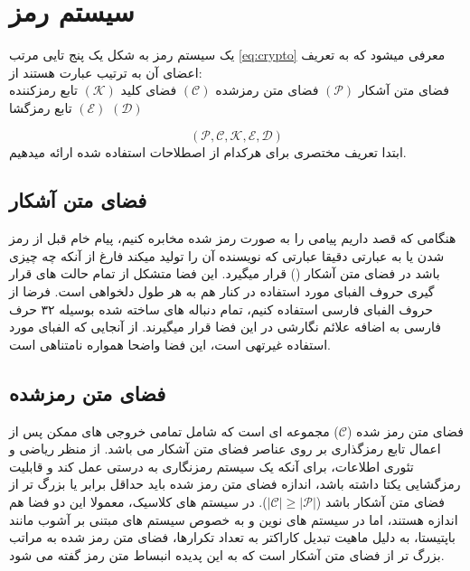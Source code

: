 \documentclass[12pt]{report}
\begin{document}
\section[ سیستم رمز  ]{ سیستم رمز}
یک سیستم رمز به شکل یک پنج تایی مرتب
\eqref{eq:crypto}
معرفی میشود که به تعریف اعضای آن به ترتیب عبارت هستند از: \\
فضای متن آشکار
$(\mathcal{P})$
\lr{--}
فضای متن رمزشده
$(\mathcal{C})$
\lr{--}
فضای کلید
$(\mathcal{K})$
\lr{--}
تابع رمزکننده
$(\mathcal{E})$
\lr{--}
تابع رمزگشا
$(\mathcal{D})$


\begin{equation}
    \left( \mathcal{P}, \mathcal{C}, \mathcal{K}, \mathcal{E}, \mathcal{D} \right)  \label{eq:crypto}
\end{equation}
ابتدا تعریف مختصری برای هرکدام از اصطلاحات استفاده شده ارائه میدهیم.

\newpage

\subsection[فضای متن آشکار]{فضای متن آشکار}
\label{sec:plaintext-space}
هنگامی که قصد داریم پیامی را به صورت رمز شده مخابره کنیم، پیام خام قبل از رمز شدن یا به عبارتی دقیقا
عبارتی که نویسنده آن را تولید میکند فارغ از آنکه چه چیزی باشد در فضای متن آشکار
()
قرار میگیرد.
این فضا متشکل از تمام حالت های قرار گیری حروف الفبای مورد استفاده در کنار هم به هر طول دلخواهی است.
فرضا از حروف الفبای فارسی استفاده کنیم، تمام دنباله های ساخته شده بوسیله  ۳۲ حرف فارسی به اضافه علائم نگارشی در این فضا قرار میگیرند.
از آنجایی که الفبای مورد استفاده غیرتهی است، این فضا واضحا همواره نامتناهی است.

\subsection[ فضای متن رمزشده  ]{ فضای متن رمزشده }
فضای متن رمز شده ($\mathcal{C}$) مجموعه ای است که شامل تمامی خروجی های ممکن پس از اعمال تابع 
رمزگذاری بر روی عناصر فضای متن آشکار می باشد. از منظر ریاضی و تئوری اطلاعات، برای آنکه یک سیستم 
رمزنگاری به درستی عمل کند و قابلیت رمزگشایی یکتا داشته باشد، اندازه فضای متن رمز شده باید حداقل 
برابر یا بزرگ تر از فضای متن آشکار باشد ($|\mathcal{C}| \ge |\mathcal{P}|$). در سیستم های 
کلاسیک، معمولا این دو فضا هم اندازه هستند، اما در سیستم های نوین و به خصوص سیستم های مبتنی بر 
آشوب مانند باپتیستا، به دلیل ماهیت تبدیل کاراکتر به تعداد تکرارها، فضای متن رمز شده به مراتب 
بزرگ تر از فضای متن آشکار است که به این پدیده انبساط متن رمز 
گفته می شود.
\end{document}
